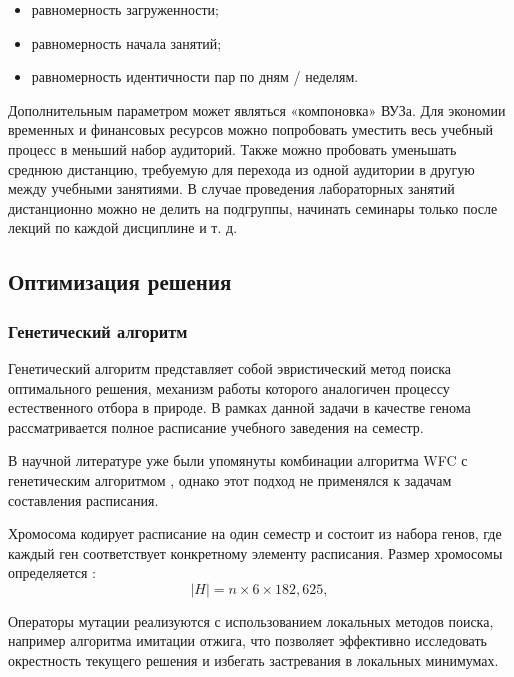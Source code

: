 \begin{itemize}
	\item равномерность загруженности;
	\item равномерность начала занятий;
	\item равномерность идентичности пар по дням / неделям.
\end{itemize}

Дополнительным параметром может являться «компоновка» ВУЗа. Для экономии временных и финансовых ресурсов можно попробовать уместить весь учебный процесс в меньший набор аудиторий. Также можно пробовать уменьшать среднюю дистанцию, требуемую для перехода из одной аудитории в другую между учебными занятиями. В случае проведения лабораторных занятий дистанционно можно не делить на подгруппы, начинать семинары только после лекций по каждой дисциплине и т. д.

\subsection{Оптимизация решения}

\subsubsection{Генетический алгоритм}

Генетический алгоритм представляет собой эвристический метод поиска оптимального решения,
механизм работы которого аналогичен процессу естественного отбора в природе. В рамках данной задачи
в качестве генома рассматривается полное расписание учебного заведения на семестр.

В научной литературе уже были упомянуты комбинации алгоритма WFC с генетическим алгоритмом \cite{bailly:geneticwfc}, однако этот подход не применялся к задачам составления расписания.

Хромосома кодирует расписание на один семестр и состоит из набора генов, где каждый ген
соответствует конкретному элементу расписания.
Размер хромосомы определяется :
\begin{equation}
	|H| = n \times 6 \times 182{,}625,
	\label{eq:chromosome-size}
\end{equation}

Операторы мутации реализуются с использованием локальных методов поиска, например алгоритма имитации отжига, что позволяет эффективно исследовать окрестность текущего решения и избегать застревания в локальных минимумах.

